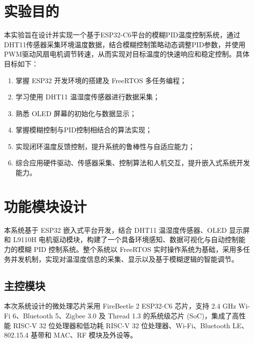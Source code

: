 \documentclass[UTF8]{ctexart}
\begin{document}
\section{实验目的}
本实验旨在设计并实现一个基于ESP32-C6平台的模糊PID温度控制系统，通过DHT11传感器采集环境温度数据，结合模糊控制策略动态调整PID参数，并使用PWM驱动风扇电机调节转速，从而实现对目标温度的快速响应和稳定控制。具体目标如下：
	\begin{enumerate}
		\item 掌握 ESP32 开发环境的搭建及 FreeRTOS 多任务编程；
		\item 学习使用 DHT11 温湿度传感器进行数据采集；
		\item 熟悉 OLED 屏幕的初始化与数据显示；
		\item 掌握模糊控制与PID控制相结合的算法实现；
		\item 实现闭环温度反馈控制，提升系统的鲁棒性与自适应能力；
		\item 综合应用硬件驱动、传感器采集、控制算法和人机交互，提升嵌入式系统开发能力。
	\end{enumerate}
\section{功能模块设计}
本系统基于 ESP32 嵌入式平台开发，结合 DHT11 温湿度传感器、OLED 显示屏和 L9110H 电机驱动模块，构建了一个具备环境感知、数据可视化与自动控制能力的模糊 PID 控制系统。整个系统以 FreeRTOS 实时操作系统为基础，采用多任务并发机制，实现对温湿度信息的采集、显示以及基于模糊逻辑的智能调节。
\subsection{主控模块}
本次系统设计的微处理芯片采用 FireBeetle 2 ESP32-C6 芯片，支持 2.4 GHz Wi-Fi 6、Bluetooth 5、Zigbee 3.0 及 Thread 1.3 的系统级芯片 (SoC)，集成了高性能 RISC-V 32 位处理器和低功耗 RISC-V 32 位处理器、Wi-Fi、Bluetooth LE、802.15.4 基带和 MAC、RF 模块及外设等。
\end{document}

